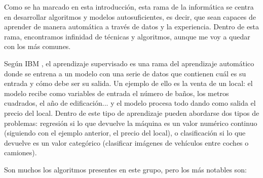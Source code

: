 	Como se ha marcado en esta introducción, esta rama de la informática se centra en desarrollar algoritmos y modelos autosuficientes, es decir, que sean capaces de aprender de manera automática a través de datos y la experiencia. Dentro de esta rama, encontramos infinidad de técnicas y algoritmos, aunque me voy a quedar con los más comunes.
	
	Según IBM \cite{ibm:machine_learning}, el aprendizaje supervisado es una rama del aprendizaje automático donde se entrena a un modelo con una serie de datos que contienen cuál es su entrada y cómo debe ser su salida. Un ejemplo de ello es la venta de un local: el modelo recibe como variables de entrada el número de baños, los metros cuadrados, el año de edificación... y el modelo procesa todo dando como salida el precio del local. Dentro de este tipo de aprendizaje pueden abordarse dos tipos de problemas: regresión si lo que devuelve la máquina es un valor numérico continuo (siguiendo con el ejemplo anterior, el precio del local), o clasificación si lo que devuelve es un valor categórico (clasificar imágenes de vehículos entre coches o camiones).
	
	Son muchos los algoritmos presentes en este grupo, pero los más notables son:
	
